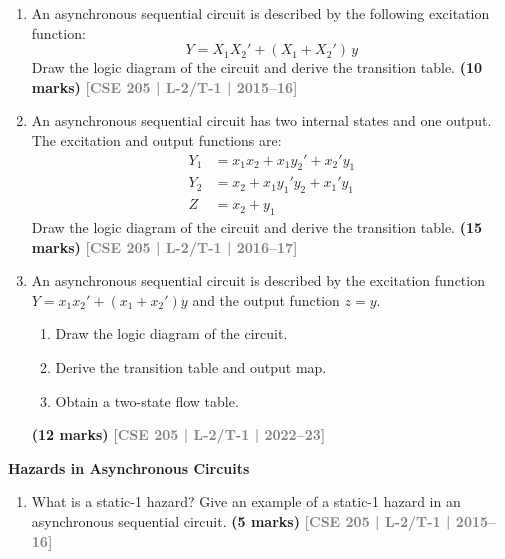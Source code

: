 \documentclass[12pt,a4paper]{article}
\newcommand{\yr}[1]{\hfill\textcolor{gray}{\small\textbf{[#1]}}}
\newcommand{\mk}[1]{\textcolor{orange!70!black}{\small\textbf{(#1 marks)}}}
\newcommand{\subtopic}[2]{%
  \vspace{10pt}
  \noindent\begin{tcolorbox}[colback=#1!8,colframe=#1,boxrule=0.6pt,arc=4pt,
    left=6pt,right=6pt,top=4pt,bottom=4pt]
    \small\bfseries\textcolor{#1}{#2}
  \end{tcolorbox}
  \vspace{2pt}
}
\begin{document}
\begin{enumerate}

\item An asynchronous sequential circuit is described by the following excitation function:
\[ Y = X_1 X_2' + (X_1 + X_2')\,y \]
Draw the logic diagram of the circuit and derive the transition table.
\mk{10} \yr{CSE 205 | L-2/T-1 | 2015--16}


\item An asynchronous sequential circuit has two internal states and one output. The excitation and output functions are:
\begin{align*}
  Y_1 &= x_1 x_2 + x_1 y_2' + x_2' y_1 \\
  Y_2 &= x_2 + x_1 y_1' y_2 + x_1' y_1 \\
  Z   &= x_2 + y_1
\end{align*}
Draw the logic diagram of the circuit and derive the transition table.
\mk{15} \yr{CSE 205 | L-2/T-1 | 2016--17}

\item An asynchronous sequential circuit is described by the excitation function $Y = x_1x_2' + (x_1 + x_2')y$ and the output function $z = y$.
\begin{enumerate}
  \item Draw the logic diagram of the circuit.
  \item Derive the transition table and output map.
  \item Obtain a two-state flow table.
\end{enumerate}
\mk{12} \yr{CSE 205 | L-2/T-1 | 2022--23}

\end{enumerate}

\subtopic{cF}{Hazards in Asynchronous Circuits}
\label{sub:s6-hazards}

\begin{enumerate}

\item What is a static-1 hazard? Give an example of a static-1 hazard in an asynchronous sequential circuit.
\mk{5} \yr{CSE 205 | L-2/T-1 | 2015--16}

\end{enumerate}
\end{document}
